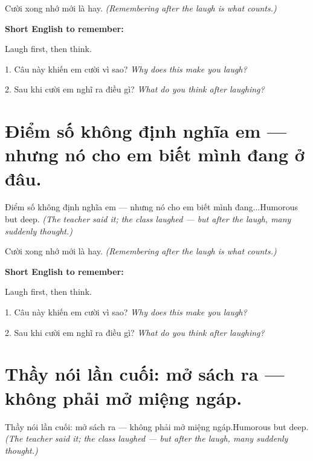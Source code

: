 \begin{baihoc}
Cười xong nhớ mới là hay.
\textit{(Remembering after the laugh is what counts.)}
\end{baihoc}

\begin{ghinhoanh}
\textbf{Short English to remember:}

Laugh first, then think.

\end{ghinhoanh}

\begin{tuhocnhanh}
1. Câu này khiến em cười vì sao? \textit{Why does this make you laugh?}

2. Sau khi cười em nghĩ ra điều gì? \textit{What do you think after laughing?}
\end{tuhocnhanh}
\ngancach


\section{Điểm số không định nghĩa em — nhưng nó cho em biết mình đang ở đâu.}
\begin{truyen}{Điểm số không định nghĩa em — nhưng nó cho em biết mình đang...}{Humorous but deep.}
\textit{(The teacher said it; the class laughed — but after the laugh, many suddenly thought.)}
\end{truyen}

\begin{baihoc}
Cười xong nhớ mới là hay.
\textit{(Remembering after the laugh is what counts.)}
\end{baihoc}

\begin{ghinhoanh}
\textbf{Short English to remember:}

Laugh first, then think.

\end{ghinhoanh}

\begin{tuhocnhanh}
1. Câu này khiến em cười vì sao? \textit{Why does this make you laugh?}

2. Sau khi cười em nghĩ ra điều gì? \textit{What do you think after laughing?}
\end{tuhocnhanh}
\ngancach


\section{Thầy nói lần cuối: mở sách ra — không phải mở miệng ngáp.}
\begin{truyen}{Thầy nói lần cuối: mở sách ra — không phải mở miệng ngáp.}{Humorous but deep.}
\textit{(The teacher said it; the class laughed — but after the laugh, many suddenly thought.)}
\end{truyen}

